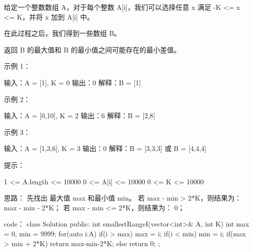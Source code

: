 给定一个整数数组 A，对于每个整数 A[i]，我们可以选择任意 x 满足 -K <= x <= K，并将 x 加到 A[i] 中。

在此过程之后，我们得到一些数组 B。

返回 B 的最大值和 B 的最小值之间可能存在的最小差值。

 

示例 1：

输入：A = [1], K = 0
输出：0
解释：B = [1]

示例 2：

输入：A = [0,10], K = 2
输出：6
解释：B = [2,8]

示例 3：

输入：A = [1,3,6], K = 3
输出：0
解释：B = [3,3,3] 或 B = [4,4,4]

 

提示：

    1 <= A.length <= 10000
    0 <= A[i] <= 10000
    0 <= K <= 10000






























思路：
先找出 最大值 max 和最小值 min。
若 max - min > 2*K，则结果为： max - min - 2*K；
若 max - min <= 2*K，则结果为： 0；






























code：
class Solution {
public:
    int smallestRangeI(vector<int>& A, int K) {
        int max = 0, min = 9999;
        for(auto i:A)
        {
            if(i > max) max = i;
            if(i < min) min = i;
        }
        if(max > min + 2*K)
            return max-min-2*K;
        else return 0;
    }
};
